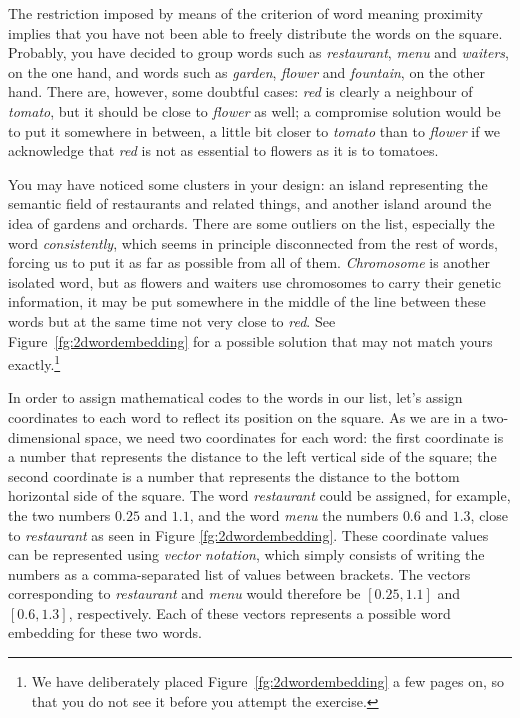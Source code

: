 \documentclass[output=paper,colorlinks,citecolor=brown]{langscibook}
\begin{document}
The restriction imposed by means of the criterion of word meaning proximity implies that you have not been able to freely distribute the words on the square. Probably, you have decided to group words such as \emph{restaurant}, \emph{menu} and \emph{waiters}, on the one hand, and words such as \emph{garden}, \emph{flower} and \emph{fountain}, on the other hand. There are, however, some doubtful cases: \emph{red} is clearly a neighbour of \emph{tomato}, but it should be close to \emph{flower} as well; a compromise solution would be to put it somewhere in between, a little bit closer to \emph{tomato} than to \emph{flower} if we acknowledge that \emph{red} is not as essential to flowers as it is to tomatoes. 

You may have noticed some clusters in your design: an island representing the semantic field of restaurants and related things, and another island around the idea of gardens and orchards. There are some outliers on the list, especially the word \emph{consistently}, which seems in principle disconnected from the rest of words, forcing us to put it as far as possible from all of them. \emph{Chromosome} is another isolated word, but as flowers and waiters use chromosomes to carry their genetic information, it may be put somewhere in the middle of the line between these words but at the same time not very close to \emph{red}. See Figure~\ref{fg:2dwordembedding} for a possible solution that may not match yours exactly.\footnote{We have deliberately placed Figure~\ref{fg:2dwordembedding} a few pages on, so that you do not see it before you attempt the exercise.}


In order to assign mathematical codes to the words in our list, let’s assign coordinates to each word to reflect its position on the square. As we are in a two-dimensional space, we need two coordinates for each word: the first coordinate is a number that represents the distance to the left vertical side of the square; the second coordinate is a number that represents the distance to the bottom horizontal side of the square. The word \emph{restaurant} could be assigned, for example, the two numbers $0.25$ and $1.1$, and the word \emph{menu} the numbers $0.6$ and $1.3$,
close to \emph{restaurant} as seen in Figure \ref{fg:2dwordembedding}. These coordinate values can be represented using \emph{vector notation}, which simply consists of writing the numbers as a comma-separated list of values between brackets. The vectors corresponding to \emph{restaurant} and \emph{menu} would therefore be $[0.25, 1.1]$ and $[0.6, 1.3]$,
respectively. Each of these vectors represents a possible word embedding for these two words.
\end{document}
